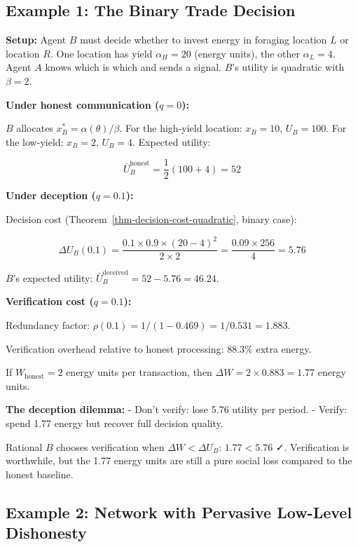 \documentclass[11pt]{article}
\theoremstyle{plain}
\theoremstyle{definition}
\theoremstyle{remark}
\let\origsubsection\subsection
\renewcommand{\subsection}{\needspace{7\baselineskip}\origsubsection}
\begin{document}
\subsection{Example 1: The Binary Trade
Decision}\label{example-1-the-binary-trade-decision}

\textbf{Setup:} Agent \(B\) must decide whether to invest energy in
foraging location \(L\) or location \(R\). One location has yield
\(\alpha_H = 20\) (energy units), the other \(\alpha_L = 4\). Agent
\(A\) knows which is which and sends a signal. \(B\)'s utility is
quadratic with \(\beta = 2\).

\textbf{Under honest communication (\(q = 0\)):}

\(B\) allocates \(x_B^* = \alpha(\theta)/\beta\). For the high-yield
location: \(x_B = 10\), \(U_B = 100\). For the low-yield: \(x_B = 2\),
\(U_B = 4\). Expected utility:

\[\bar{U}_B^{\text{honest}} = \frac{1}{2}(100 + 4) = 52\]

\textbf{Under deception (\(q = 0.1\)):}

Decision cost (Theorem~\ref{thm-decision-cost-quadratic}, binary case):

\[\Delta U_B(0.1) = \frac{0.1 \times 0.9 \times (20 - 4)^2}{2 \times 2} = \frac{0.09 \times 256}{4} = 5.76\]

\(B\)'s expected utility:
\(\bar{U}_B^{\text{deceived}} = 52 - 5.76 = 46.24\).

\textbf{Verification cost (\(q = 0.1\)):}

Redundancy factor: \(\rho(0.1) = 1/(1 - 0.469) = 1/0.531 = 1.883\).

Verification overhead relative to honest processing: \(88.3\%\) extra
energy.

If \(W_{\text{honest}} = 2\) energy units per transaction, then
\(\Delta W = 2 \times 0.883 = 1.77\) energy units.

\textbf{The deception dilemma:} - Don't verify: lose 5.76 utility per
period. - Verify: spend 1.77 energy but recover full decision quality.

Rational \(B\) chooses verification when \(\Delta W < \Delta U_B\):
\(1.77 < 5.76\) ✓. Verification is worthwhile, but the 1.77 energy units
are still a pure social loss compared to the honest baseline.

\subsection{Example 2: Network with Pervasive Low-Level
Dishonesty}\label{example-2-network-with-pervasive-low-level-dishonesty}
\end{document}
